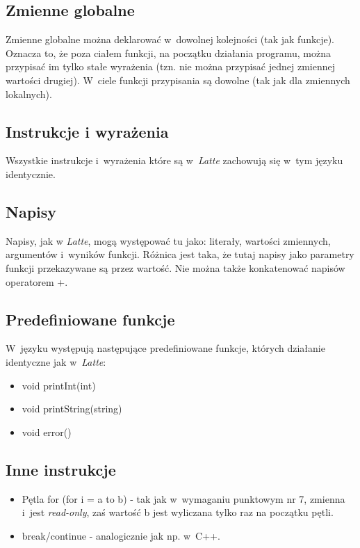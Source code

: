 \documentclass{article}
\begin{document}
\subsection{Zmienne globalne}
Zmienne globalne można deklarować w~dowolnej kolejności (tak jak funkcje).
Oznacza to, że poza ciałem funkcji, na początku działania programu, można przypisać im
tylko stałe wyrażenia (tzn. nie można przypisać jednej zmiennej wartości drugiej).
W~ciele funkcji przypisania są dowolne (tak jak dla zmiennych lokalnych).

\subsection{Instrukcje i wyrażenia}
Wszystkie instrukcje i~wyrażenia które są w~\textit{Latte} 
zachowują się w~tym języku identycznie.

\subsection{Napisy}
Napisy, jak w \textit{Latte}, mogą występować tu jako:
literały, wartości zmiennych, argumentów i~wyników funkcji.
Różnica jest taka, że tutaj napisy jako parametry funkcji przekazywane są przez wartość.
Nie można także konkatenować napisów operatorem +.

\subsection{Predefiniowane funkcje}
W~języku występują następujące predefiniowane funkcje, 
których działanie identyczne jak w~\textit{Latte}:
\begin{itemize}
    \item void printInt(int)
    \item void printString(string)
    \item void error()
\end{itemize}

\subsection{Inne instrukcje}
\begin{itemize}
    \item Pętla for (for i = a to b) - tak jak w~wymaganiu punktowym nr 7,
    zmienna i~jest \textit{read-only}, 
    zaś wartość b jest wyliczana tylko raz na początku pętli.
    \item break/continue - analogicznie jak np. w~C++.
\end{itemize}
\end{document}
